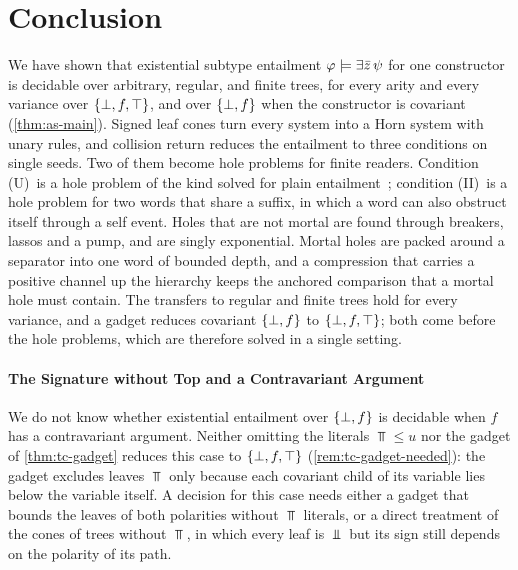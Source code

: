 
\providecommand{\CondI}{\textup{(I0)}}
\providecommand{\CondU}{\textup{(U)}}
\providecommand{\CondII}{\textup{(II)}}

\section{Conclusion}\label{sec:concl}

We have shown that existential subtype entailment $\varphi\models\exists\bar z\,\psi$
for one constructor is decidable over arbitrary, regular, and finite trees, for
every arity and every variance over $\{\bot,f,\top\}$, and over $\{\bot,f\}$ when the
constructor is covariant (\cref{thm:as-main}). Signed leaf cones turn every
system into a Horn system with unary rules, and collision return reduces the
entailment to three conditions on single seeds. Two of them become hole
problems for finite readers. Condition \CondU\ is a hole problem of the
kind solved for plain entailment~\citep{Zhao26}; condition \CondII\ is a hole problem for two words that share
a suffix, in which a word can also obstruct itself through a self event. Holes
that are not mortal are found through breakers, lassos and a pump, and are
singly exponential. Mortal holes are packed around a separator into one word of
bounded depth, and a compression that carries a positive channel up the
hierarchy keeps the anchored comparison that a mortal hole must contain. The
transfers to regular and finite trees hold for every variance, and a gadget
reduces covariant $\{\bot,f\}$ to $\{\bot,f,\top\}$; both come before the hole problems, which
are therefore solved in a single setting.

\paragraph{The Signature without Top and a Contravariant Argument}
We do not know whether existential entailment over $\{\bot,f\}$ is decidable when $f$
has a contravariant argument. Neither omitting the literals $\Top\le u$ nor
the gadget of \cref{thm:tc-gadget} reduces this case to $\{\bot,f,\top\}$
(\cref{rem:tc-gadget-needed}): the gadget excludes leaves $\Top$ only
because each covariant child of its variable lies below the variable itself.
A decision for this case needs either a gadget that bounds the leaves of both
polarities without $\Top$ literals, or a direct treatment of the cones of
trees without $\Top$, in which every leaf is $\Bot$ but its sign still depends
on the polarity of its path.

